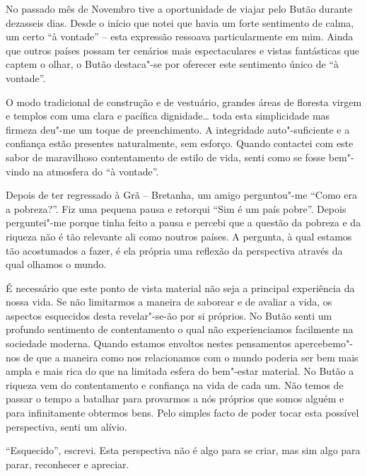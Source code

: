 No passado mês de Novembro tive a oportunidade de viajar pelo Butão
durante dezasseis dias. Desde o início que notei que havia um forte
sentimento de calma, um certo ``à vontade'' -- esta expressão ressoava
particularmente em mim. Ainda que outros países possam ter cenários mais
espectaculares e vistas fantásticas que captem o olhar, o Butão
destaca"-se por oferecer este sentimento único de ``à vontade''.

\enlargethispage{2\baselineskip}

O modo tradicional de construção e de vestuário, grandes áreas de
floresta virgem e templos com uma clara e pacífica dignidade\ldots{}
toda esta simplicidade mas firmeza deu"-me um toque de preenchimento. A
integridade auto"-suficiente e a confiança estão presentes naturalmente,
sem esforço. Quando contactei com este sabor de maravilhoso
contentamento de estilo de vida, senti como se fosse bem"-vindo na
atmosfera do ``à vontade''.

Depois de ter regressado à Grã -- Bretanha, um amigo perguntou"-me ``Como
era a pobreza?''. Fiz uma pequena pausa e retorqui ``Sim é um país
pobre''. Depois perguntei"-me porque tinha feito a pausa e percebi que a
questão da pobreza e da riqueza não é tão relevante ali como noutros
países. A pergunta, à qual estamos tão acostumados a fazer, é ela
própria uma reflexão da perspectiva através da qual olhamos o mundo.

É necessário que este ponto de vista material não seja a principal
experiência da nossa vida. Se não limitarmos a maneira de saborear e de
avaliar a vida, os aspectos esquecidos desta revelar"-se-ão por si
próprios. No Butão senti um profundo sentimento de contentamento o qual
não experienciamos facilmente na sociedade moderna. Quando estamos
envoltos nestes pensamentos apercebemo"-nos de que a maneira como nos
relacionamos com o mundo poderia ser bem mais ampla e mais rica do que
na limitada esfera do bem"-estar material. No Butão a riqueza vem do
contentamento e confiança na vida de cada um. Não temos de passar o
tempo a batalhar para provarmos a nós próprios que somos alguém e para
infinitamente obtermos bens. Pelo simples facto de poder tocar esta
possível perspectiva, senti um alívio.

``Esquecido'', escrevi. Esta perspectiva não é algo para se criar, mas
sim algo para parar, reconhecer e apreciar.

